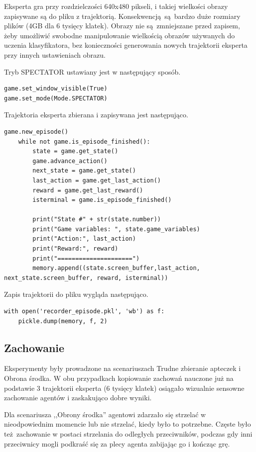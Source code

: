 \documentclass[polish,master,a4paper,oneside]{ppfcmthesis}
\begin{document}
Eksperta gra przy rozdzielczości 640x480 pikseli, i takiej wielkości obrazy zapisywane są do pliku z trajektorią. Konsekwencją są bardzo duże rozmiary plików (4GB dla 6 tysięcy klatek). Obrazy nie są zmniejszane przed zapisem, żeby umożliwić swobodne manipulowanie wielkością obrazów używanych do uczenia klasyfikatora, bez konieczności generowania nowych trajektorii eksperta przy innych ustawieniach obrazu.

\vspace{5mm}

Tryb SPECTATOR ustawiany jest w następujący sposób.
\begin{lstlisting}[language=iPython]
game.set_window_visible(True)
game.set_mode(Mode.SPECTATOR)
\end{lstlisting}

Trajektoria eksperta zbierana i zapisywana jest następująco.

\begin{lstlisting}[language=iPython]
    game.new_episode()
    while not game.is_episode_finished():
        state = game.get_state()
        game.advance_action()
        next_state = game.get_state()
        last_action = game.get_last_action()
        reward = game.get_last_reward()
        isterminal = game.is_episode_finished()

        print("State #" + str(state.number))
        print("Game variables: ", state.game_variables)
        print("Action:", last_action)
        print("Reward:", reward)
        print("=====================")
        memory.append((state.screen_buffer,last_action, next_state.screen_buffer, reward, isterminal))
\end{lstlisting}

Zapis trajektorii do pliku wygląda następująco.

\begin{lstlisting}[language=iPython]
with open('recorder_episode.pkl', 'wb') as f:
    pickle.dump(memory, f, 2)
\end{lstlisting}

\subsection{Zachowanie}
Eksperymenty były prowadzone na scenariuszach Trudne zbieranie apteczek i Obrona środka.
W obu przypadkach kopiowanie zachowań nauczone już na podstawie 3 trajektorii eksperta (6 tysięcy klatek) osiągało wizualnie sensowne zachowanie agentów i zaskakująco dobre wyniki.

Dla scenariusza ,,Obrony środka'' agentowi zdarzało się strzelać w nieodpowiednim momencie lub nie strzelać, kiedy było to potrzebne. Częste było też zachowanie w postaci strzelania do odległych przeciwników, podczas gdy inni przeciwnicy mogli podkraść się za plecy agenta zabijając go i kończąc grę.
\end{document}
